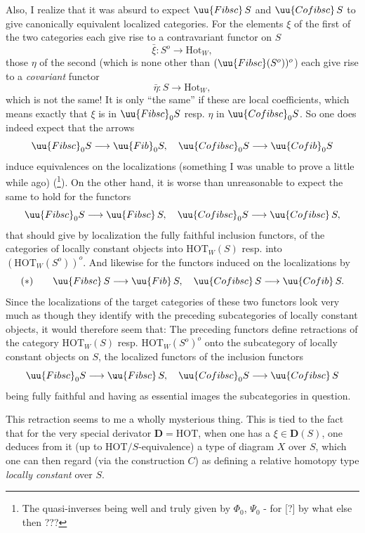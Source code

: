 Also, I realize that it was absurd to expect $\uu{Fibsc}\, S$ and $\uu{Cofibsc}\, S$ to give canonically equivalent localized categories. For the elements $\xi$ of the first
of the two categories each give rise to a contravariant functor on $S$
\[
\bar{\xi} : S^o \longrightarrow \mathrm{Hot}_W,
\]
those $\eta$ of the second (which is none other than $(\uu{Fibsc}(S^o))^o$) each give rise to a \textit{covariant} functor
\[
\bar{\eta} : S \longrightarrow \mathrm{Hot}_W,
\]
which is not the same! It is only ``the same'' if these are local coefficients, which means exactly that $\xi$ is in $\uu{Fibsc}_0 S$ resp. $\eta$ in $\uu{Cofibsc}_0 S$. So one does indeed expect  that the arrows
\[
\uu{Fibsc}_0 S \longrightarrow \uu{Fib}_0 S, \quad \uu{Cofibsc}_0 S \longrightarrow \uu{Cofib}_0 S
\]
induce equivalences on the localizations (something I was unable to prove a little while ago) (\setcounter{footnote}{15}\footnote{The quasi-inverses being well and truly given by $\Phi_0$, $\Psi_0$ - for [?] by what else then ???}). On the other hand, it is worse than unreasonable to expect the same to hold for the functors
\[
\uu{Fibsc}_0 S \longrightarrow \uu{Fibsc}\, S, \quad \uu{Cofibsc}_0 S \longrightarrow \uu{Cofibsc}\, S,
\]
that should give by localization the fully faithful inclusion functors, of the categories of locally constant objects into $\mathrm{HOT}_W(S)$ resp. into $(\mathrm{HOT}_W(S^o))^o$. And likewise for
the functors induced on the localizations by
\[
(*) \qquad \uu{Fibsc}\, S \longrightarrow \uu{Fib}\, S, \quad \uu{Cofibsc}\, S \longrightarrow \uu{Cofib}\, S.
\]
Since the localizations of the target categories of these two functors look very much as though they identify with the preceding subcategories of locally constant objects, it would therefore seem that:  The preceding functors define retractions of the category $\mathrm{HOT}_W(S)$ resp. $\mathrm{HOT}_W(S^o)^o$ onto the subcategory of locally constant objects on $S$, the localized functors of the inclusion functors
\[
\uu{Fibsc}_0 S \longrightarrow \uu{Fibsc}\, S, \quad \uu{Cofibsc}_0 S \longrightarrow \uu{Cofibsc}\, S
\]
being fully faithful and having as essential images the subcategories in question.

This retraction seems to me a wholly mysterious thing. This is tied to the fact that for the very special derivator $\mathbf{D} = \mathrm{HOT}$, when one has a $\xi \in \mathbf{D}(S)$, one deduces from it (up to $\mathrm{HOT}/S$-equivalence) a type of diagram $X$ over $S$,
which one can then regard (via the construction $C$) as defining a relative homotopy type \textit{locally constant} over $S$.

